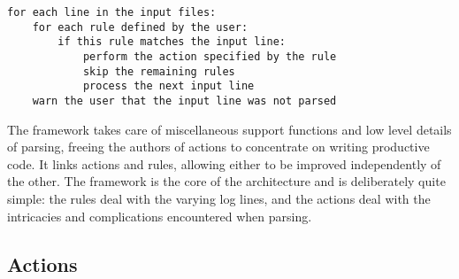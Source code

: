 \documentclass[draft]{svmult}
\begin{document}
\begin{verbatim}
for each line in the input files: 
    for each rule defined by the user: 
        if this rule matches the input line:
            perform the action specified by the rule
            skip the remaining rules
            process the next input line
    warn the user that the input line was not parsed
\end{verbatim}

The framework takes care of miscellaneous support functions and low level
details of parsing, freeing the authors of actions to concentrate on
writing productive code.  It links actions and rules, allowing either to be
improved independently of the other.  The framework is the core of the
architecture and is deliberately quite simple: the rules deal with the
varying log lines, and the actions deal with the intricacies and
complications encountered when parsing.

\subsection{Actions}

\label{Actions}
\end{document}
